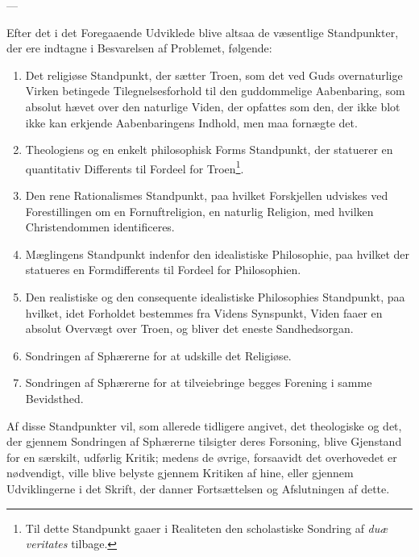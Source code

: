 \documentclass[12pt,a4paper]{book}
\newcommand{\opage}[1]{\marginnote{\footnotesize\textit{[#1]}}}
\begin{document}
\begin{center}
---
\end{center}

Efter det i det Foregaaende Udviklede blive altsaa de væsentlige Standpunkter,
der ere indtagne i Besvarelsen af Problemet, følgende:

\begin{enumerate}[label=\arabic*)]
\item Det religiøse Standpunkt, der sætter Troen, som det ved Guds overnaturlige
  Virken betingede Tilegnelsesforhold til den guddommelige Aabenbaring, som
  absolut hævet over den naturlige Viden, der opfattes som den, der ikke blot
  ikke kan erkjende Aabenbaringens Indhold, men maa fornægte det.
\item Theologiens og en enkelt philosophisk Forms Standpunkt, der statuerer en
  quantitativ Differents til Fordeel for Troen\footnote{Til dette Standpunkt
  gaaer i Realiteten den scholastiske Sondring af \textit{duæ veritates}
  tilbage.}.
\item \opage{31}Den rene Rationalismes Standpunkt, paa hvilket Forskjellen udviskes ved
  Forestillingen om en Fornuftreligion, en naturlig Religion, med hvilken
  Christendommen identificeres.
\item Mæglingens Standpunkt indenfor den idealistiske Philosophie, paa hvilket
  der statueres en Formdifferents til Fordeel for Philosophien.
\item Den realistiske og den consequente idealistiske Philosophies Standpunkt,
  paa hvilket, idet Forholdet bestemmes fra Videns Synspunkt, Viden faaer en
  absolut Overvægt over Troen, og bliver det eneste Sandhedsorgan.
\item Sondringen af Sphærerne for at udskille det Religiøse.
\item Sondringen af Sphærerne for at tilveiebringe begges Forening i samme
  Bevidsthed.
\end{enumerate}

Af disse Standpunkter vil, som allerede tidligere angivet, det theologiske og
det, der gjennem Sondringen af Sphærerne tilsigter deres Forsoning, blive
Gjenstand for en særskilt, udførlig Kritik; medens de øvrige, forsaavidt det
overhovedet er nødvendigt, ville blive belyste gjennem Kritiken af hine, eller
gjennem Udviklingerne i det Skrift, der danner Fortsættelsen og Afslutningen af
dette.


\end{document}
